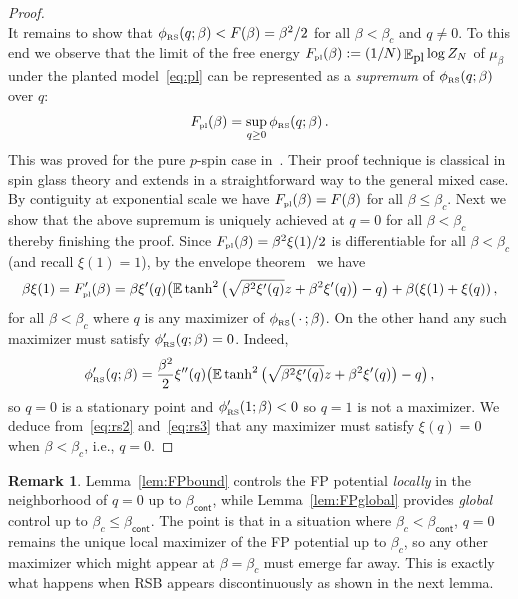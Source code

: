 \documentclass[11pt]{article}
\theoremstyle{definition}
\newtheorem{remark}[theorem]{Remark}
\numberwithin{equation}{section}
\newcommand{\<}{\langle}
\renewcommand{\>}{\rangle}
\def\bbE{{\mathbb{E}}}
\def\pl{\mbox{\rm\tiny pl}}
\def\plsmall{\mbox{\rm\small pl}}
\def\RS{\mbox{\tiny\rm RS}}
\DeclareMathOperator*{\E}{\bbE}
\def\cont{{\mathsf{cont}}}
\begin{document}
\begin{proof}
\begin{equation}
\end{equation}
It remains to show that $\phi_{\RS}(q;\beta) < F(\beta) = \beta^2/2$ for all $\beta < \beta_c$ and $q\neq 0$. To this end we observe that the limit of the free energy $F_{\pl}(\beta) := (1/N) \E_{\plsmall} \log Z_N$ of $\mu_{\beta}$ under the planted model~\eqref{eq:pl} can be represented as a \emph{supremum} of $\phi_{\RS}(q;\beta)$ over $q$: 
\begin{equation}\label{eq:FPbound5}
F_{\pl}(\beta) = \sup_{q \ge 0} \phi_{\RS}(q;\beta) \,.
\end{equation}
This was proved for the pure $p$-spin case in~\cite[Theorem 1]{lesieur2017statistical}. Their proof technique is classical in spin glass theory and extends in a straightforward way to the general mixed case.
By contiguity at exponential scale we have $F_{\pl}(\beta) = F(\beta)$ for all $\beta\le\beta_c$.  
Next we show that the above supremum is uniquely achieved at $q=0$ for all $\beta<\beta_c$ thereby finishing the proof. Since $F_{\pl}(\beta) = \beta^2\xi(1)/2$ is differentiable for all $\beta<\beta_c$ (and recall $\xi(1)=1$), by the envelope theorem~\cite{milgrom2002envelope} we have
\begin{equation}\label{eq:rs2}
\beta\xi(1) = F_{\pl}'(\beta) = \beta \xi'(q)\big(\bbE \tanh^2\big(\sqrt{\beta^2 \xi'(q)}z + \beta^2 \xi'(q)\big) - q\big) + \beta(\xi(1)+\xi(q))\,,
\end{equation}
for all $\beta<\beta_c$ where $q$ is any maximizer of $\phi_{\RS}(\,\cdot\,;\beta)$. On the other hand any such maximizer must satisfy $\phi_{\RS}'(q;\beta)=0$. Indeed,
\begin{equation}\label{eq:rs3}
\phi_{\RS}'(q;\beta) = \frac{\beta^2}{2}\xi''(q)\big(\bbE \tanh^2\big(\sqrt{\beta^2 \xi'(q)}z + \beta^2 \xi'(q)\big) - q\big)\,,
\end{equation}
so $q=0$ is a stationary point and $\phi_{\RS}'(1;\beta)<0$ so $q=1$ is not a maximizer. We deduce from~\eqref{eq:rs2} and~\eqref{eq:rs3} that any maximizer must satisfy $\xi(q)=0$ when $\beta<\beta_c$, i.e., $q=0$. 
\end{proof}

\begin{remark}
Lemma~\ref{lem:FPbound} controls the FP potential \emph{locally} in the neighborhood of $q=0$ up to $\beta_\cont$, while Lemma~\ref{lem:FPglobal} provides \emph{global} control up to $\beta_c \le \beta_\cont$. The point is that in a situation where $\beta_c < \beta_\cont$, $q=0$ remains the unique local maximizer of the FP potential up to $\beta_c$, so any other maximizer which might appear at $\beta = \beta_c$ must emerge far away. This is exactly what happens when RSB appears discontinuously as shown in the next lemma.   
\end{remark}
\end{document}
